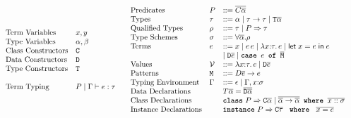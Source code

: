 \documentclass[format=sigplan,manuscript,review,screen,nonacm,margin=1in]{acmart}
\begin{document}
\begin{figure}[ht]
  \[
  \begin{array}{l l l}
    &\text{Term Variables}     &x, y\\
    &\text{Type Variables}     &\alpha, \beta\\
    &\text{Class Constructors} &\texttt{C}\\
    &\text{Data Constructors}  &\texttt{D}\\
    &\text{Type Constructors}  &\texttt{T}\\
    \\
    &\text{Term Typing}        &P \mid \Gamma \vdash e : \tau

  \end{array}
  \begin{array}{l l l l}
    &\text{Predicates}      &P &\mathrel{{:}{:}{=}} \overline{C\overline{\alpha}}\\
    &\text{Types}           &\tau   &\mathrel{{:}{:}{=}} \alpha \mathrel{\mid} \tau\to\tau \mathrel{\mid} \texttt{T}\overline{\alpha}\\
    &\text{Qualified Types} &\rho   &\mathrel{{:}{:}{=}} \tau \mathrel{\mid} P\Rightarrow\tau\\
    &\text{Type Schemes}    &\sigma &\mathrel{{:}{:}{=}} \forall{\overline{\alpha}}.\rho\\
    &\text{Terms}           &e    &\mathrel{{:}{:}{=}} x \mathrel{\mid} e\, e \mathrel{\mid} \lambda x{:}\tau.\, e \mathrel{\mid} \mathsf{let}\;x = e\;\mathsf{in}\;e\\
    &                       &       &\mathrel{\mid} \texttt{D}\overline{e} \mathrel{\mid} \texttt{\textbf{case }} e \texttt{\textbf{ of }} \overline{\texttt{M}}\\
    &\text{Values}          &\mathcal{V}   &\mathrel{{:}{:}{=}} \lambda x{:}\tau.\, e \mathrel{\mid} \texttt{D}\overline{e}\\
    &\text{Patterns}        &\texttt{M} &\mathrel{{:}{:}{=}} D\overline{e} \to e\\
    &\text{Typing Environment} &\Gamma &\mathrel{{:}{:}{=}} \epsilon \mathrel{\mid} \Gamma,x{:}\sigma
    \\
    &\text{Data Declarations}     &    &T \overline{\alpha} = \overline{\texttt{D} \overline{\alpha}}\\
    &\text{Class Declarations}    &    &\texttt{\textbf{class}}\ P \Rightarrow \texttt{C}\overline{\alpha}
                                         \mid \overline{\overline{\alpha} \to \overline{\alpha}}
                                             \texttt{\textbf{ where }}\overline{x :: \sigma}\\
    &\text{Instance Declarations} &    &\texttt{\textbf{instance}}\ P \Rightarrow \texttt{C}\overline{\tau}~
                                         \texttt{\textbf{ where }}~ \overline{x = e}
  \end{array}
  \]
  \caption{\TCFD}
  \label{fig:ty-fd-formal}
\end{figure}
\end{document}
